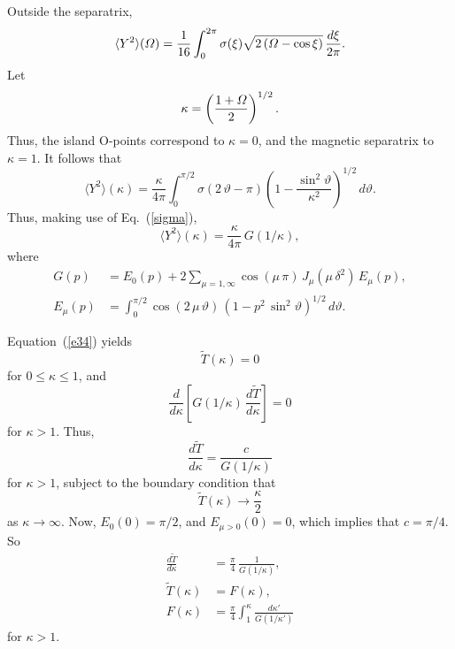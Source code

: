 \documentclass[12pt,prb,aps]{revtex4-1}
\begin{document}
Outside the separatrix,
\begin{equation}
\langle Y^2\rangle({\mit\Omega}) = \frac{1}{16}\int_0^{2\pi}\sigma(\xi)\sqrt{2\,({\mit\Omega}-\cos\xi)}\,\frac{d\xi}{2\pi}.
\end{equation}
Let 
\begin{equation}\label{kappa}
\kappa= \left(\frac{1+{\mit\Omega}}{2}\right)^{1/2}.
\end{equation}
Thus, the island O-points correspond to $\kappa=0$, and the magnetic separatrix to $\kappa=1$. 
It follows that 
\begin{equation}
\langle Y^2\rangle(\kappa) = \frac{\kappa}{4\pi}\int_0^{\pi/2}\sigma(2\,\vartheta-\pi)\left(1-\frac{\sin^2\vartheta}{\kappa^2}\right)^{1/2}\,d\vartheta.
\end{equation}
Thus, making use of Eq.~(\ref{sigma}), 
\begin{equation}
\langle Y^2\rangle(\kappa) = \frac{\kappa}{4\pi}\,G(1/\kappa),
\end{equation}
where
\begin{align}
G(p) &=E_0(p) +2\sum_{\mu=1,\infty}\cos(\mu\,\pi)\,J_\mu(\mu\,\delta^2)\,E_\mu(p),\\[0.5ex]
E_\mu(p) &= \int_0^{\pi/2} \cos(2\,\mu\,\vartheta)\,(1-p^2\,\sin^2\vartheta)^{1/2}\,d\vartheta.
\end{align}

Equation~(\ref{e34}) yields
\begin{equation}
\tilde{T}(\kappa) = 0
\end{equation}
for $0\leq\kappa\leq 1$, and 
\begin{equation}
\frac{d}{d\kappa}\!\left[G(1/\kappa)\,\frac{d\tilde{T}}{d\kappa}\right]=0
\end{equation}
for $\kappa>1$. Thus,
\begin{equation}
\frac{d\tilde{T}}{d\kappa} = \frac{c}{G(1/\kappa)}
\end{equation}
for $\kappa>1$, subject to the boundary condition that
\begin{equation}
\tilde{T}(\kappa)\rightarrow \frac{\kappa}{2}
\end{equation}
as $\kappa\rightarrow \infty$. Now, $E_0(0) = \pi/2$, and  $E_{\mu>0}(0) = 0$,
which implies that $c=\pi/4$. So
\begin{align}\label{e47x}
\frac{d\tilde{T}}{d\kappa} &= \frac{\pi}{4}\,\frac{1}{G(1/\kappa)},\\[0.5ex]
\tilde{T}(\kappa) &= F(\kappa),\label{e48}\\[0.5ex]
F(\kappa) &= \frac{\pi}{4}\int_1^\kappa\frac{d\kappa'}{G(1/\kappa')}
\end{align}
for $\kappa>1$. 
\end{document}
